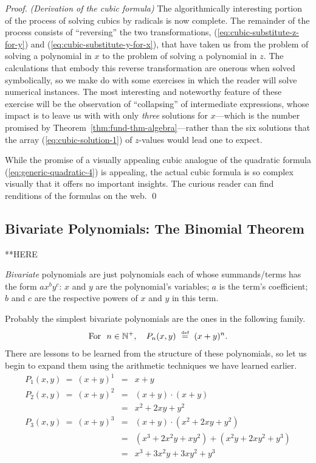 \begin{proof} {\it (Derivation of the cubic formula)}
The algorithmically interesting portion of the process of solving
cubics by radicals is now complete.  The remainder of the process
consists of ``reversing'' the two transformations,
(\ref{eq:cubic-substitute-z-for-y}) and
(\ref{eq:cubic-substitute-y-for-x}), that have taken us from the
problem of solving a polynomial in $x$ to the problem of solving a
polynomial in $z$.  The calculations that embody this reverse
transformation are onerous when solved symbolically, so we make do
with some exercises in which the reader will solve numerical
instances.  The most interesting and noteworthy feature of these
exercise will be the observation of ``collapsing'' of intermediate
expressions, whose impact is to leave us with with only {\em three}
solutions for $x$---which is the number promised by
Theorem~\ref{thm:fund-thm-algebra}---rather than the six solutions
that the array (\ref{eq:cubic-solution-1}) of $z$-values would lead
one to expect.

While the promise of a visually appealing cubic analogue of the
quadratic formula (\ref{eq:generic-quadratic-4}) is appealing, the
actual cubic formula is so complex visually that it offers no
important insights.  The curious reader can find renditions of the
formulas on the web.  \qed
\end{proof}

\subsection{Bivariate Polynomials: The Binomial Theorem}
\label{sec:bivariate-polynomials}
\label{sec:Binomial-thm}

**HERE

{\em Bivariate} polynomials are just polynomials each of whose
summands/terms has the form $a x^b y^c$: $x$ and $y$ are the polynomial's
variables; $a$ is the term's coefficient; $b$ and $c$ are the
respective powers of $x$ and $y$ in this term.

Probably the simplest bivariate polynomials are the ones in the
following family.
\begin{equation}
\label{eq:binomial-polys}
\mbox{For } \ n \in \mathbb{N}^+, \ \ \
P_n(x,y) \ \stackrel{\mbox{{\tiny def}}}{=} \ (x+y)^n.
\end{equation}
There are lessons to be learned from the structure of these
polynomials, so let us begin to expand them using the arithmetic
techniques we have learned earlier.
\begin{eqnarray*}
P_1(x,y) \ = \
(x+y)^1 & = & x+y  \\
P_2(x,y) \ = \
(x+y)^2 & = & (x+y) \cdot (x+y) \\
        & = & x^2 + 2xy + y^2 \\
P_3(x,y) \ = \
(x+y)^3 & = & (x+y) \cdot (x^2 + 2xy + y^2) \\
   & = & (x^3 + 2x^2y +  xy^2) + (x^2y + 2xy^2 + y^3) \\
   & = & x^3 + 3x^2y + 3xy^2 + y^3  
\end{eqnarray*}

